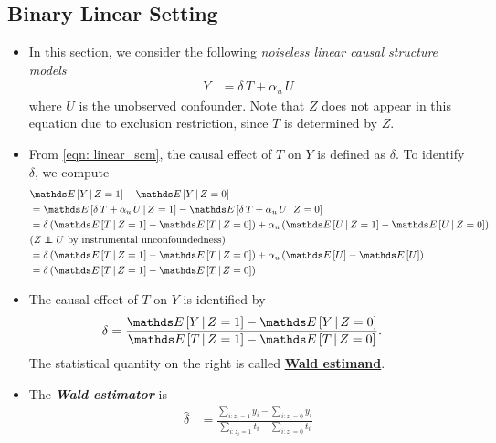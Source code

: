 \documentclass[11pt]{article}
\begin{document}
\subsection{Binary Linear Setting}
\begin{itemize}
\item In this section, we consider the following \emph{noiseless linear causal structure models}
\begin{align}
Y &= \delta\,T + \alpha_{u}\, U \label{eqn: linear_scm}
\end{align} where $U$ is the unobserved confounder. Note that $Z$ does not appear in this equation due to exclusion restriction, since $T$ is determined by $Z$.

\item From \eqref{eqn: linear_scm}, the causal effect of $T$ on $Y$ is defined as $\delta$. To identify $\delta$, we compute
\begin{align*}
&\E{}{Y \,|\, Z = 1} - \E{}{Y \,|\, Z = 0} \\
&= \E{}{\delta\,T + \alpha_{u}\, U \,|\, Z = 1} - \E{}{ \delta\,T + \alpha_{u}\, U \,|\, Z = 0} \\
&= \delta \paren{\E{}{T\,|\, Z = 1} - \E{}{T\,|\, Z = 0}} + \alpha_{u}\paren{\E{}{U\,|\, Z = 1} - \E{}{U\,|\, Z = 0}} \\
& (Z \indep U \text{ by instrumental unconfoundedness}) \\
&= \delta \paren{\E{}{T\,|\, Z = 1} - \E{}{T\,|\, Z = 0}} + \alpha_{u}\paren{\E{}{U} - \E{}{U}} \\
&= \delta \paren{\E{}{T\,|\, Z = 1} - \E{}{T\,|\, Z = 0}}
\end{align*} 

\item \begin{proposition}
The causal effect of $T$ on $Y$ is identified by 
\begin{align}
\delta &= \frac{\E{}{Y \,|\, Z = 1} - \E{}{Y \,|\, Z = 0}}{\E{}{T\,|\, Z = 1} - \E{}{T\,|\, Z = 0}}. \label{eqn: wald_est}
\end{align}
The statistical quantity on the right is called \underline{\textbf{Wald estimand}}.
\end{proposition} 

\item The \emph{\textbf{Wald estimator}} is
\begin{align}
\hat{\delta} &= \frac{\sum_{i: z_i = 1}y_i - \sum_{i: z_i = 0}y_i }{\sum_{i: z_i = 1}t_i - \sum_{i: z_i = 0}t_i} \label{eqn: wald_stats}
\end{align}


\end{itemize}
\end{document}
